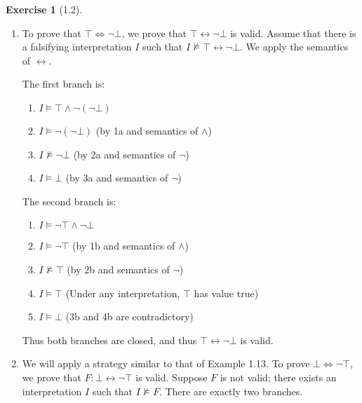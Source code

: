 \documentclass[12pt, psamsfonts]{amsart}
\theoremstyle{definition}
\newtheorem*{exer}{Exercise}
\theoremstyle{remark}
\numberwithin{equation}{subsection}
\begin{document}
\begin{exer}[1.2]
    $ $
    \begin{enumerate}[label=(\alph*)]
        \item
            To prove that $\top \Leftrightarrow \neg \bot$, we prove that $\top \leftrightarrow \neg \bot$ is valid.
            Assume that there is a falsifying interpretation $I$ such that $I \not\models \top \leftrightarrow \neg \bot$.
            We apply the semantics of $\leftrightarrow$.

            The first branch is:
            \begin{enumerate}[label=\arabic*a.]
                \item %
                    $I \models \top \land \neg(\neg \bot)$ 
                \item %
                    $I \models \neg(\neg \bot)$ (by 1a and semantics of $\land$)
                \item %
                    $I \not\models \neg \bot$ (by 2a and semantics of $\neg$)
                \item %
                    $I \models \bot$ (by 3a and semantics of $\neg$)
            \end{enumerate}

            The second branch is:
            \begin{enumerate}[label=\arabic*b.]
                \item %
                    $I \models \neg \top \land \neg \bot$ 
                \item %
                    $I \models \neg \top$ (by 1b and semantics of $\land$)
                \item %
                    $I \not\models \top$ (by 2b and semantics of $\neg$)
                \item %
                    $I \models \top$ (Under any interpretation, $\top$ has value true)
                \item %
                    $I \models \bot$ (3b and 4b are contradictory)
            \end{enumerate}
            Thus both branches are closed, and thus $\top \leftrightarrow \neg \bot$ is valid.
        \item
            We will apply a strategy similar to that of Example 1.13.
            To prove $\bot \Leftrightarrow \neg \top$, we prove that $F: \bot \leftrightarrow \neg \top$ is valid.
            Suppose $F$ is not valid; there exists an interpretation $I$ such that $I \not\models F$.
            There are exactly two branches.


\end{enumerate}
\end{exer}
\end{document}

